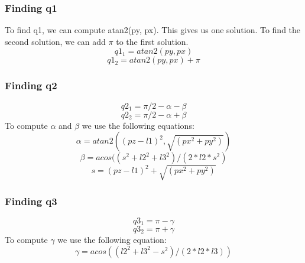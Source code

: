 \documentclass{article}
\begin{document}
  \subsubsection{Finding q1}
  To find q1, we can compute atan2(py, px). This gives us one solution. To find the second solution, we can add ${\pi}$ to the first solution.
   \begin{equation}
   	q1_{1} = atan2(py,px) 
   \end{equation}
   \begin{equation}
   q1_{2} = atan2(py,px) + \pi
   \end{equation}
   
   \subsubsection{Finding q2}
   \begin{equation}
   q2_{1} = \pi/2 - \alpha - \beta 
   \end{equation}
   \begin{equation}
   q2_{2} = \pi/2 - \alpha + \beta
   \end{equation}
    To compute ${\alpha}$ and ${\beta}$ we use the following equations:
    \begin{equation}
    \alpha = atan2((pz-l1)^2, \sqrt{(px^2 + py^2)})
    \end{equation}
    \begin{equation}
    \beta = acos((s^2 + l2^2 + l3^2)/ (2*l2*s^2) 
    \end{equation}
    \begin{equation}
    s = (pz-l1)^2 + \sqrt{(px^2 + py^2)}
    \end{equation}
	\subsubsection{Finding q3}
	\begin{equation}
	q3_{1} = \pi - \gamma
	\end{equation}
	\begin{equation}
	q3_{2} = \pi + \gamma
	\end{equation}
	To compute ${\gamma}$ we use the following equation:
	\begin{equation}
	\gamma = acos((l2^2+l3^2-s^2)/(2*l2*l3))
	\end{equation}
\end{document}
